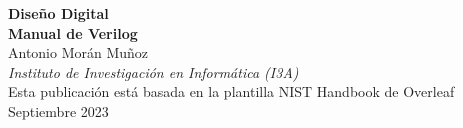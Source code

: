 \documentclass[12pt]{article}
\begin{document}
\begin{titlepage}
\begin{flushright}
\LARGE{\textbf{Diseño Digital}}\\
\vfill 
\Huge{\textbf{Manual de Verilog}}\\
    \vfill
    \normalsize Antonio Morán Muñoz\\
     \textit{Instituto de Investigación en Informática (I3A)}\\
    \vfill
\normalsize Esta publicación está basada en la plantilla NIST Handbook de Overleaf\\
\vfill
\normalsize Septiembre 2023
\vfill


\end{flushright}
\end{titlepage}
\end{document}
